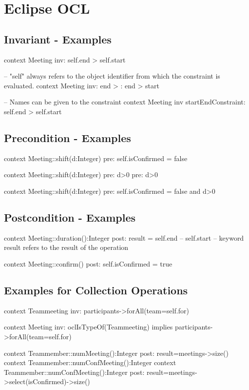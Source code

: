 \chapter{Eclipse OCL}

\section{Invariant - Examples}

\begin{ocl}
context Meeting inv: self.end > self.start

-- "self" always refers to the object identifier from which the constraint is evaluated.
context Meeting inv: end > : end > start

-- Names can be given to the constraint
context Meeting inv startEndConstraint:
self.end > self.start
\end{ocl}

\section{Precondition - Examples}
\begin{ocl}
context Meeting::shift(d:Integer)
pre: self.isConfirmed = false

context Meeting::shift(d:Integer)
pre: d>0 pre: d>0

context Meeting::shift(d:Integer)
pre: self.isConfirmed = false and d>0
\end{ocl}

\section{Postcondition - Examples}
\begin{ocl}

context Meeting::duration():Integer
post: result = self.end – self.start
-- keyword result refers to the result of the operation

context Meeting::confirm()
post: self.isConfirmed = true
\end{ocl}


\section{Examples for Collection Operations}
\begin{ocl}
context Teammeeting
inv: participants->forAll(team=self.for)

context Meeting inv: oclIsTypeOf(Teammeeting)
implies participants->forAll(team=self.for)

context Teammember::numMeeting():Integer
post: result=meetings->size()
context Teammember::numConfMeeting():Integer context Teammember::numConfMeeting():Integer
post: result=meetings->select(isConfirmed)->size()
\end{ocl}